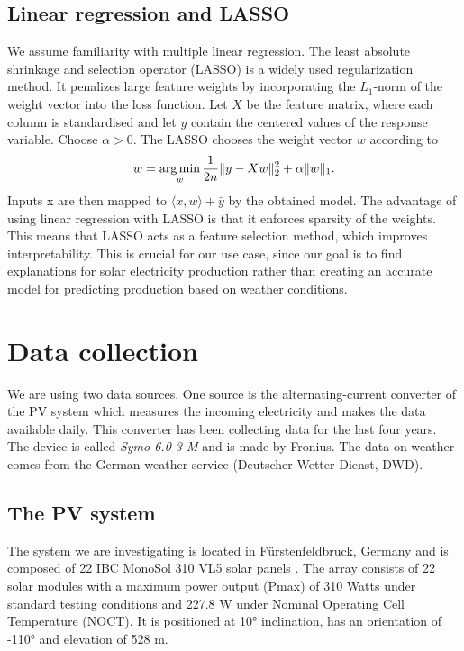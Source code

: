 \documentclass{article}
\begin{document}
\subsection{Linear regression and LASSO}
We assume familiarity with multiple linear regression. The least absolute shrinkage and selection operator (LASSO) is a widely used regularization method. It penalizes large feature weights by incorporating the $L_1$-norm of the weight vector into the loss function. Let $X$ be the feature matrix, where each column is standardised and let $y$ contain the centered values of the response variable. Choose $\alpha > 0$. The LASSO chooses the weight vector $w$ according to
\begin{equation*}
	w = \underset{w}{\text{arg\,min}} \, \frac{1}{2n} \|y - Xw\|_2^2 + \alpha \|w\|_1.
\end{equation*}
Inputs x are then mapped to $\langle x, w \rangle + \bar{y}$ by the obtained model. The advantage of using linear regression with LASSO is that it enforces sparsity of the weights. This means that LASSO acts as a feature selection method, which improves interpretability. This is crucial for our use case, since our goal is to find explanations for solar electricity production rather than creating an accurate model for predicting production based on weather conditions.


\section{Data collection}
We are using two data sources. One source is the alternating-current converter of the PV system which measures the incoming electricity and makes the data available daily.
This converter has been collecting data for the last four years. The device is called \textit{Symo 6.0-3-M} and is made by Fronius.
The data on weather comes from the German weather service (Deutscher Wetter Dienst, DWD).
\subsection{The PV system}
The system we are investigating is located in Fürstenfeldbruck, Germany and is composed of 22 IBC MonoSol 310 VL5 solar panels \cite{MonoSol}.
The array consists of 22 solar modules with a maximum power output (Pmax) of 310 Watts under standard testing conditions and 227.8 W  under Nominal Operating Cell Temperature (NOCT).
It is positioned at 10° inclination, has an orientation of -110° and elevation of 528 m.
\end{document}
